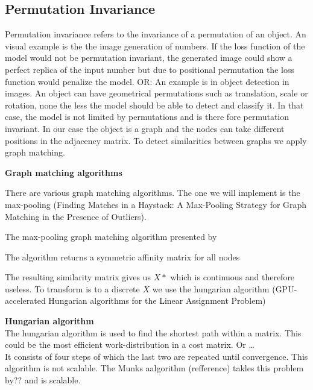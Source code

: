 \subsection{Permutation Invariance}


Permutation invariance refers to the invariance of a permutation of an object. An visual example is the the image generation of numbers. If the loss function of the model would not be permutation invariant, the generated image could show a perfect replica of the input number but due to positional permutation the loss function would penalize the model. 
OR: An example is in object detection in images. An object can have geometrical permutations such as translation, scale or rotation, none the less the model should be able to detect and classify it. In that case, the model is not limited by permutations and  is there fore permutation invariant.
In our case the object is a graph and the nodes can take different positions in the adjacency matrix. To detect similarities between graphs we apply graph matching.

\textbf{Graph matching algorithms}

There are various graph matching algorithms. The one we will implement is the max-pooling (Finding Matches in a Haystack: A Max-Pooling Strategy for Graph Matching in the Presence of Outliers). 

The max-pooling graph matching algorithm presented by

The algorithm returns a symmetric affinity matrix for all nodes

The resulting similarity matrix gives us $X*$ which is continuous and therefore useless. To transform is to a discrete $X$ we use the hungarian algorithm (GPU-accelerated Hungarian algorithms for the Linear
Assignment Problem)

\textbf{Hungarian algorithm}\\
The hungarian algorithm is used to find the shortest path within a matrix. This could be the most efficient work-distribution in a cost matrix. Or \dots \\
It consists of four steps of which the last two are repeated until convergence. This algorithm is not scalable. The Munks aalgorithm (refference) takles this problem by?? and is scalable.

